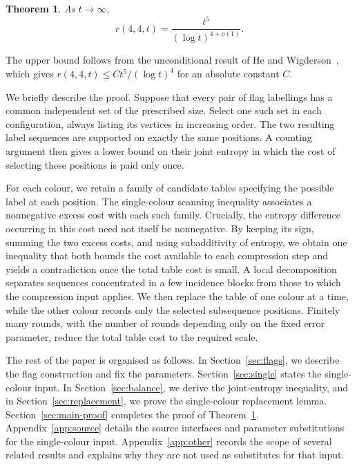\documentclass[11pt]{article}
\newtheorem{theorem}{Theorem}[section]
\theoremstyle{definition}
\theoremstyle{remark}
\begin{document}
\begin{theorem}\label{thm:main}
As $t\to\infty$,
\[
 r(4,4,t)=\frac{t^5}{(\log t)^{4+o(1)}}.
\]
\end{theorem}

The upper bound follows from the unconditional result of He and
Wigderson~\cite[Theorem~4 and Appendix~B]{HW}, which gives
$r(4,4,t)\le Ct^5/(\log t)^4$ for an absolute constant $C$.

We briefly describe the proof. Suppose that every pair of flag
labellings has a common independent set of the prescribed size. Select
one such set in each configuration, always listing its vertices in
increasing order. The two resulting label sequences are supported on
exactly the same positions. A counting argument then gives a lower
bound on their joint entropy in which the cost of selecting these
positions is paid only once.

For each colour, we retain a family of candidate tables specifying the
possible label at each position. The single-colour scanning inequality
associates a nonnegative excess cost with each such family. Crucially,
the entropy difference occurring in this cost need not itself be
nonnegative. By keeping its sign, summing the two excess costs, and
using subadditivity of entropy, we obtain one inequality that both
bounds the cost available to each compression step and yields a
contradiction once the total table cost is small. A local decomposition
separates sequences concentrated in a few incidence blocks from those
to which the compression input applies. We then replace the table of
one colour at a time, while the other colour records only the selected
subsequence positions. Finitely many rounds, with the number of rounds
depending only on the fixed error parameter, reduce the total table
cost to the required scale.

The rest of the paper is organised as follows. In
Section~\ref{sec:flags}, we describe the flag construction and fix the
parameters. Section~\ref{sec:single} states the single-colour input.
In Section~\ref{sec:balance}, we derive the joint-entropy inequality,
and in Section~\ref{sec:replacement}, we prove the single-colour
replacement lemma. Section~\ref{sec:main-proof} completes the proof of
Theorem~\ref{thm:main}. Appendix~\ref{app:source} details the source
interfaces and parameter substitutions for the single-colour input.
Appendix~\ref{app:other} records the scope of several related results
and explains why they are not used as substitutes for that input.
\end{document}
